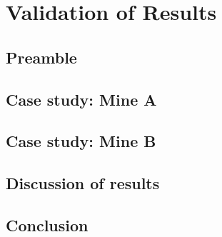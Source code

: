 \chapter{Validation of Results}
\section{Preamble}
\section{Case study: Mine A}
\section{Case study: Mine B}
\section{Discussion of results}
\section{Conclusion}